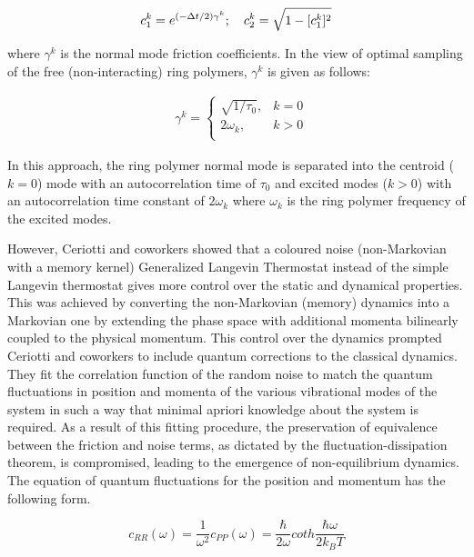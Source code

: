 \begin{equation}
    c_1^{k}=e^{(-\Delta t/2)\gamma^{k}} ; \quad  c_2^{k}=\sqrt{1-[c_1^{k}]^2}\label{QNMD-92}\\    
\end{equation}

\noindent where $\gamma^{k}$ is the normal mode friction coefficients. In the view of optimal sampling of the free (non-interacting) ring polymers, $\gamma^{k}$ is given as follows:

\begin{align}
    \label{QNMD-922}
    &\gamma^{k}=
    \begin{cases}
    \sqrt{1/\tau_{0}}, &k=0\\
    2\omega_{k}, &k > 0\\
    \end{cases}    
\end{align}

 \noindent In this approach, the ring polymer normal mode is separated into the centroid ($k=0$) mode with an autocorrelation time of $\tau_0$ and excited modes ($k > 0$) with an autocorrelation time constant of  $2\omega_k$ where $\omega_k$ is the ring polymer frequency of the excited modes. 

 \noindent However, Ceriotti and coworkers showed that a coloured noise (non-Markovian with a memory kernel) Generalized Langevin Thermostat\cite{ceriotti2009langevin} instead of the simple Langevin thermostat gives more control over the static and dynamical properties. This was achieved by converting the non-Markovian (memory) dynamics into a Markovian one\cite{ceriotti2010novel} by extending the phase space with additional momenta bilinearly coupled to the physical momentum. This control over the dynamics prompted Ceriotti and coworkers\cite{ceriotti2009nuclear} to  include quantum corrections to the classical dynamics. They fit the correlation function of the random noise to match the quantum fluctuations in position and momenta of the various vibrational modes of the system in such a way that minimal apriori knowledge about the system is required. As a result of this fitting procedure, the preservation of equivalence between the friction and noise terms, as dictated by the fluctuation-dissipation theorem, is compromised, leading to the emergence of non-equilibrium dynamics. The equation of quantum fluctuations for the position and momentum has the following form.

  \begin{equation}
    c_{RR}(\omega) = \frac{1}{\omega^2} c_{PP}(\omega) = \frac{\hbar}{2\omega} coth \frac{\hbar \omega}{2k_BT} \label{QNMD-97}    
\end{equation}


